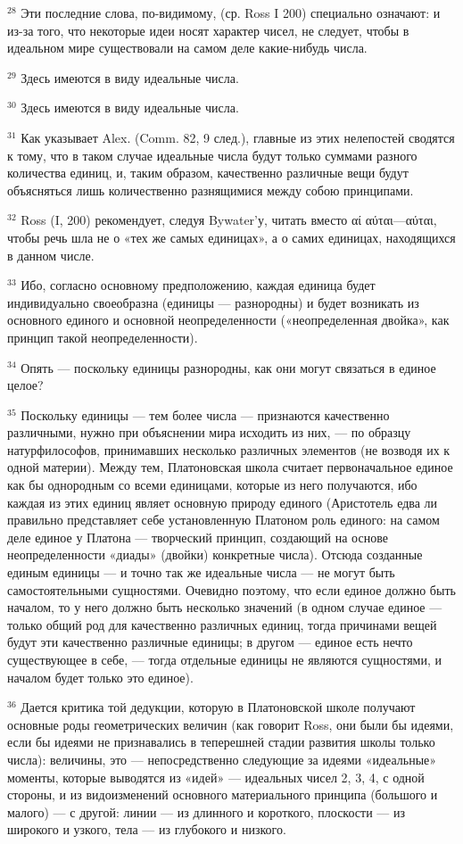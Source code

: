 \documentclass[oneside, 17pt, dvipsnames]{extbook}
\begin{document}
$^{28}$ Эти последние слова, по-видимому, (ср. Ross I 200) специально означают: и из-за того, что некоторые идеи носят характер чисел, не следует, чтобы в идеальном мире существовали на самом деле какие-нибудь числа.

$^{29}$ Здесь имеются в виду идеальные числа.

$^{30}$ Здесь имеются в виду идеальные числа.

$^{31}$ Как указывает Alex. (Comm. 82, 9 след.), главные из этих нелепостей сводятся к тому, что в таком случае идеальные числа будут только суммами разного количества единиц, и, таким образом, качественно различные вещи будут объясняться лишь количественно разнящимися между собою принципами.

$^{32}$ Ross (I, 200) рекомендует, следуя Bywater'у, читать вместо αί αύται—αύται, чтобы речь шла не о «тех же самых единицах», а о самих единицах, находящихся в данном числе.

$^{33}$ Ибо, согласно основному предположению, каждая единица будет индивидуально своеобразна (единицы — разнородны) и будет возникать из основного единого и основной неопределенности («неопределенная двойка», как принцип такой неопределенности).

$^{34}$ Опять — поскольку единицы разнородны, как они могут связаться в единое целое?

$^{35}$ Поскольку единицы — тем более числа — признаются качественно различными, нужно при объяснении мира исходить из них, — по образцу натурфилософов, принимавших несколько различных элементов (не возводя их к одной материи). Между тем, Платоновская школа считает первоначальное единое как бы однородным со всеми единицами, которые из него получаются, ибо каждая из этих единиц являет основную природу единого (Аристотель едва ли правильно представляет себе установленную Платоном роль единого: на самом деле единое у Платона — творческий принцип, создающий на основе неопределенности «диады» (двойки) конкретные числа). Отсюда созданные единым единицы — и точно так же идеальные числа — не могут быть самостоятельными сущностями. Очевидно поэтому, что если единое должно быть началом, то у него должно быть несколько значений (в одном случае единое — только общий род для качественно различных единиц, тогда причинами вещей будут эти качественно различные единицы; в другом — единое есть нечто существующее в себе, — тогда отдельные единицы не являются сущностями, и началом будет только это единое).

$^{36}$ Дается критика той дедукции, которую в Платоновской школе получают основные роды геометрических величин (как говорит Ross, они были бы идеями, если бы идеями не признавались в теперешней стадии развития школы только числа): величины, это — непосредственно следующие за идеями «идеальные» моменты, которые выводятся из «идей» — идеальных чисел 2, 3, 4, с одной стороны, и из видоизменений основного материального принципа (большого и малого) — с другой: линии — из длинного и короткого, плоскости — из широкого и узкого, тела — из глубокого и низкого.
\end{document}
